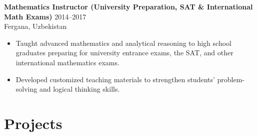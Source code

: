 \documentclass[11pt,a4paper]{article}
\begin{document}
\medskip

\textbf{Mathematics Instructor (University Preparation, SAT \& International Math Exams)} \hfill 2014--2017 \\
Fergana, Uzbekistan
\begin{itemize}
    \item Taught advanced mathematics and analytical reasoning to high school graduates preparing
for university entrance exams, the SAT, and other international mathematics exams.
    \item Developed customized teaching materials to strengthen students' problem-solving and
logical thinking skills.
\end{itemize}

\section*{Projects}
\end{document}
